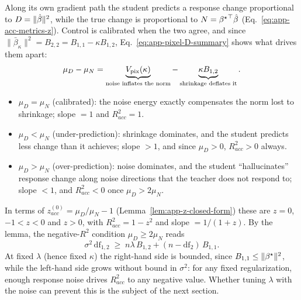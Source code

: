 \begin{remark}
\label{rem:app-calibration-balance}
{Along its own gradient path the student predicts a response
change proportional to $D=\|\hat{\beta}\|^2$, while the true change is
proportional to $N={{\beta^{\star}}}^\top\hat{\beta}$ (Eq.~\ref{eq:app-acc-metrics-z}).
Control is calibrated when the two agree, and since
$\|\bar\beta_\kappa\|^2=B_{2,2}=B_{1,1}-\kappa B_{1,2}$,
Eq.~\ref{eq:app-pixel-D-summary} shows what drives them apart:
\[
\mu_D-\mu_N=\underbrace{V_{\rm pix}(\kappa)}_{\text{noise inflates the norm}}
-\underbrace{\kappa B_{1,2}}_{\text{shrinkage deflates it}} .
\]
\begin{itemize}
\item $\mu_D=\mu_N$ (calibrated): the noise energy exactly compensates the
norm lost to shrinkage; slope $=1$ and $R^2_{acc}=1$.
\item $\mu_D<\mu_N$ (under-prediction): shrinkage dominates, and the student
predicts less change than it achieves; slope $>1$, and since $\mu_D>0$,
$R^2_{acc}>0$ always.
\item $\mu_D>\mu_N$ (over-prediction): noise dominates, and the student
``hallucinates'' response change along noise directions that the teacher
does not respond to; slope $<1$, and $R^2_{acc}<0$ once $\mu_D>2\mu_N$.
\end{itemize}
In terms of $z^{(0)}_{acc}=\mu_D/\mu_N-1$
(Lemma~\ref{lem:app-z-closed-form}) these are $z=0$, $-1<z<0$ and $z>0$, with
$R^2_{acc}=1-z^2$ and slope $=1/(1+z)$.  By the lemma, the negative-$R^2$
condition $\mu_D\ge2\mu_N$ reads
\[
\sigma^2\,\mathrm{df}_{1,2}\;\ge\;n\lambda\,B_{1,2}+(n-\mathrm{df}_2)\,B_{1,1}.
\]
At fixed $\lambda$ (hence fixed $\kappa$) the right-hand side is bounded,
since $B_{1,1}\le\|{\beta^{\star}}\|^2$, while the left-hand side grows without bound
in $\sigma^2$: for any fixed regularization, enough response noise drives
$R^2_{acc}$ to any negative value.  Whether tuning $\lambda$ with the noise
can prevent this is the subject of the next section.}
\end{remark}


